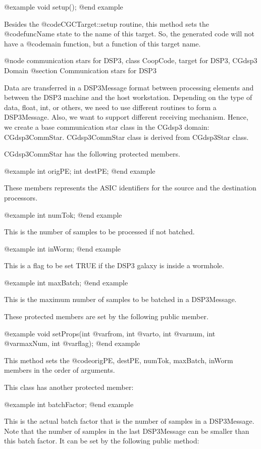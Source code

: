 {@example
void setup();
@end example

Besides the @code{CGCTarget::setup} routine, this method sets the
@code{funcName} state to the name of this target. So, the generated
code will not have a @code{main} function, but a function of this
target name.

@node communication stars for DSP3, class CoopCode, target for DSP3, CGdsp3 Domain
@section Communication stars for DSP3

Data are transferred in a DSP3Message format between processing elements and
between the DSP3 machine and the host workstation. Depending on the type of
data, float, int, or others, we need to use different routines to form
a DSP3Message. Also, we want to support different receiving mechanism.
Hence, we create a base communication star class in the CGdsp3 domain:
CGdsp3CommStar. CGdsp3CommStar class is derived from CGdsp3Star class.

CGdsp3CommStar has the following protected members.

@example
int origPE;
int destPE;
@end example

These members represents the ASIC identifiers for the source and the
destination processors.

@example
int numTok;
@end example

This is the number of samples to be processed if not batched.

@example
int inWorm;
@end example

This is a flag to be set TRUE if the DSP3 galaxy is inside a wormhole.

@example
int maxBatch;
@end example

This is the maximum number of samples to be batched in a DSP3Message.

These protected members are set by the following public member.

@example
void setProps(int @var{from}, int @var{to}, int @var{num}, int @var{maxNum}, int @var{flag});
@end example

This method sets the @code{origPE, destPE, numTok, maxBatch, inWorm} members
in the order of arguments.

This class has another protected member:

@example
int batchFactor;
@end example

This is the actual batch factor that is the number of samples in a DSP3Message.
Note that the number of samples in the last DSP3Message can be smaller than
this batch factor.
It can be set by the following public method:

}
